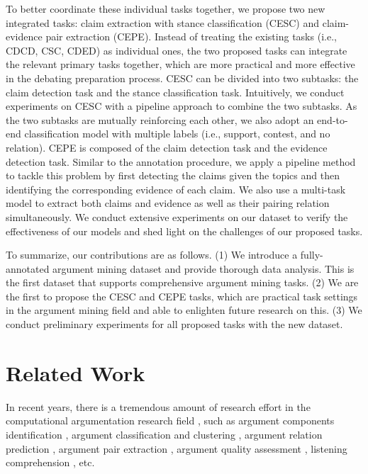 \documentclass[11pt]{article}
\begin{document}
To better coordinate these individual tasks together, we propose two new integrated tasks: claim extraction with stance classification (CESC) and claim-evidence pair extraction (CEPE).
Instead of treating the existing tasks (i.e., CDCD, 
CSC,
CDED) as individual ones, the two proposed tasks can integrate the relevant primary tasks together, which are more practical and more effective in the debating preparation process.
CESC can be divided into two subtasks: the claim detection task and the stance classification task.
Intuitively, we conduct experiments on CESC with a pipeline approach to combine the two subtasks.
As the two subtasks are mutually reinforcing each other, we also adopt an end-to-end classification model with multiple labels (i.e., support, contest, and no relation).
CEPE is composed of the claim detection task and the evidence detection task.
Similar to the annotation procedure, we apply a pipeline method to tackle this problem by first detecting the claims given the topics and then identifying the corresponding evidence of each claim.
We also use a multi-task model to extract both claims and evidence as well as their pairing relation simultaneously.
We conduct extensive experiments on our dataset to verify the effectiveness of our models and shed light on the challenges of our proposed tasks.

To summarize, our contributions are as follows.
(1) We introduce a fully-annotated argument mining dataset and provide thorough data analysis. This is the first dataset that supports comprehensive argument mining tasks. 
(2) We are the first to propose the CESC and CEPE tasks, which are practical task settings in the argument mining field and able to enlighten future research on this.
(3) We conduct preliminary experiments for all proposed tasks with the new dataset. 


\section{Related Work}

In recent years, there is a tremendous amount of research effort in the computational argumentation research field \cite{eger2017neural,bar2021advances}, such as argument components identification \cite{levy2014context,rinott2015show,lippi2016argument,daxenberger2017essence}, argument classification and clustering \cite{reimers2019classification}, argument relation prediction \cite{boltuvzic2016fill, chakrabarty2019ampersand}, argument pair extraction \cite{cabrio2012combining, cheng2020argument, cheng2021argument, yuan2021leveraging, ji2021discrete}, argument quality assessment \cite{habernal2016argument,wachsmuth2017computational,gretz2020large,toledo2019automatic}, listening comprehension \cite{mirkin2018listening}, etc.
\end{document}
